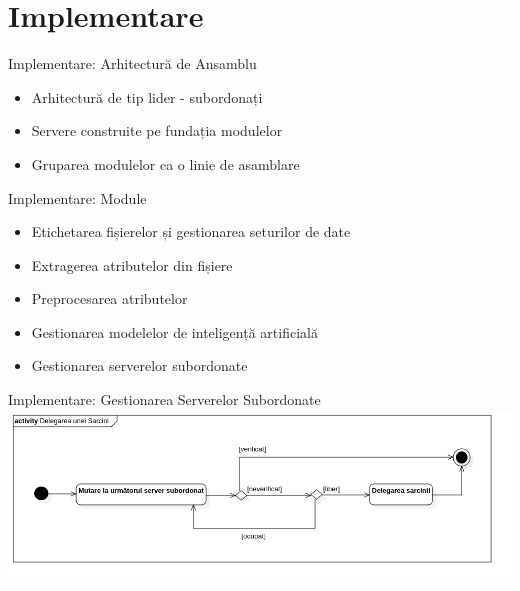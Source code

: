 \section{Implementare}

\begin{frame}{Implementare: Arhitectură de Ansamblu} \pause
	\begin{itemize}
		\item Arhitectură de tip lider - subordonați \pause
		\item Servere construite pe fundația modulelor \pause
		\item Gruparea modulelor ca o linie de asamblare
	\end{itemize}
\end{frame}

\begin{frame}{Implementare: Module} \pause
	\begin{itemize}
	    \item Etichetarea fișierelor și gestionarea seturilor de date
		\item Extragerea atributelor din fișiere
		\item Preprocesarea atributelor
		\item Gestionarea modelelor de inteligență artificială
		\item Gestionarea serverelor subordonate
	\end{itemize}
\end{frame}

\begin{frame}{Implementare: Gestionarea Serverelor Subordonate}
	\includegraphics[width=\textwidth, center]{components/images/diagrams/activity_diagram_task_delegation.png}
    \captionsetup{justification=centering,margin=1cm}
\end{frame}

